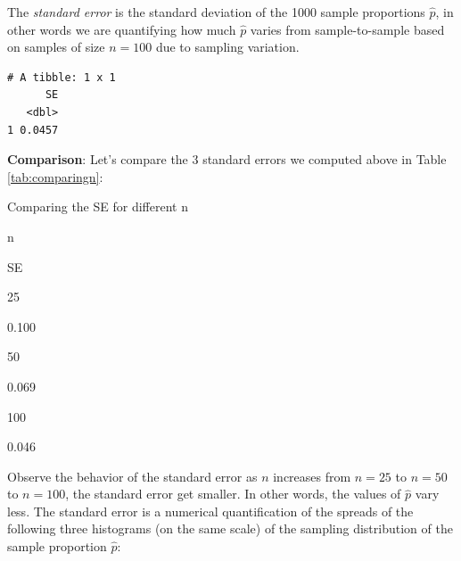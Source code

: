 \documentclass[12pt,]{krantz}
\makeatletter
\newenvironment{Shaded}{\begin{snugshade}}{\end{snugshade}}
\newcommand{\KeywordTok}[1]{\textcolor[rgb]{0.27,0.27,0.27}{\textbf{#1}}}
\newcommand{\DataTypeTok}[1]{\textcolor[rgb]{0.27,0.27,0.27}{#1}}
\newcommand{\DecValTok}[1]{\textcolor[rgb]{0.06,0.06,0.06}{#1}}
\newcommand{\StringTok}[1]{\textcolor[rgb]{0.5,0.5,0.5}{#1}}
\newcommand{\OperatorTok}[1]{\textcolor[rgb]{0.43,0.43,0.43}{\textbf{#1}}}
\newcommand{\NormalTok}[1]{#1}
\newenvironment{kframe}{%
\medskip{}
\setlength{\fboxsep}{.8em}
 \def\at@end@of@kframe{}%
 \ifinner\ifhmode%
  \def\at@end@of@kframe{\end{minipage}}%
  \begin{minipage}{\columnwidth}%
 \fi\fi%
 \def\FrameCommand##1{\hskip\@totalleftmargin \hskip-\fboxsep
 \colorbox{shadecolor}{##1}\hskip-\fboxsep
     \hskip-\linewidth \hskip-\@totalleftmargin \hskip\columnwidth}%
 \MakeFramed {\advance\hsize-\width
   \@totalleftmargin\z@ \linewidth\hsize
   \@setminipage}}%
 {\par\unskip\endMakeFramed%
 \at@end@of@kframe}
\renewenvironment{Shaded}{\begin{kframe}}{\end{kframe}}
\makeatother
\begin{document}
\begin{Shaded}
\end{Shaded}

The \emph{standard error} is the standard deviation of the 1000 sample
proportions \(\widehat{p}\), in other words we are quantifying how much
\(\widehat{p}\) varies from sample-to-sample based on samples of size
\(n=100\) due to sampling variation.

\begin{Shaded}
\end{Shaded}

\begin{verbatim}
# A tibble: 1 x 1
      SE
   <dbl>
1 0.0457
\end{verbatim}

\textbf{Comparison}: Let's compare the 3 standard errors we computed
above in Table \ref{tab:comparingn}:

\label{tab:comparingn}Comparing the SE for different n

n

SE

25

0.100

50

0.069

100

0.046

Observe the behavior of the standard error as \(n\) increases from
\(n=25\) to \(n=50\) to \(n=100\), the standard error get smaller. In
other words, the values of \(\widehat{p}\) vary less. The standard error
is a numerical quantification of the spreads of the following three
histograms (on the same scale) of the sampling distribution of the
sample proportion \(\widehat{p}\):
\end{document}
